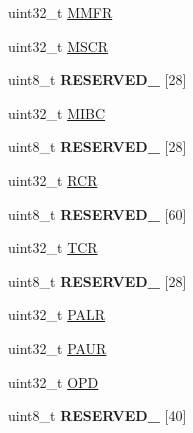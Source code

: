 \begin{DoxyCompactItemize}
\item 
uint32\+\_\+t \hyperlink{struct_e_n_e_t___mem_map_a588920cf00b8cf33e91b9a1fe5ce04ef}{M\+M\+F\+R}
\item 
uint32\+\_\+t \hyperlink{struct_e_n_e_t___mem_map_a635a1d1269e342c592757d49b5073507}{M\+S\+C\+R}
\item 
\hypertarget{struct_e_n_e_t___mem_map_a134f377e8e31e8bafd0b6f84627bc0e5}{}uint8\+\_\+t {\bfseries R\+E\+S\+E\+R\+V\+E\+D\+\_} \mbox{[}28\mbox{]}\label{struct_e_n_e_t___mem_map_a134f377e8e31e8bafd0b6f84627bc0e5}

\item 
uint32\+\_\+t \hyperlink{struct_e_n_e_t___mem_map_ab857a4b0f285d775c06ab7cf96d96f26}{M\+I\+B\+C}
\item 
\hypertarget{struct_e_n_e_t___mem_map_a144a407e1c7678814a03aef7f15e0f59}{}uint8\+\_\+t {\bfseries R\+E\+S\+E\+R\+V\+E\+D\+\_} \mbox{[}28\mbox{]}\label{struct_e_n_e_t___mem_map_a144a407e1c7678814a03aef7f15e0f59}

\item 
uint32\+\_\+t \hyperlink{struct_e_n_e_t___mem_map_a407f506f97473861cf0d5ef5a4649c02}{R\+C\+R}
\item 
\hypertarget{struct_e_n_e_t___mem_map_a09505e054f35a1c0f42b9b4750b62d9f}{}uint8\+\_\+t {\bfseries R\+E\+S\+E\+R\+V\+E\+D\+\_} \mbox{[}60\mbox{]}\label{struct_e_n_e_t___mem_map_a09505e054f35a1c0f42b9b4750b62d9f}

\item 
uint32\+\_\+t \hyperlink{struct_e_n_e_t___mem_map_ab9bb7ecf57ffae10f969d3771994d87e}{T\+C\+R}
\item 
\hypertarget{struct_e_n_e_t___mem_map_a8cc8a8e46f657955e45a040ede157948}{}uint8\+\_\+t {\bfseries R\+E\+S\+E\+R\+V\+E\+D\+\_} \mbox{[}28\mbox{]}\label{struct_e_n_e_t___mem_map_a8cc8a8e46f657955e45a040ede157948}

\item 
uint32\+\_\+t \hyperlink{struct_e_n_e_t___mem_map_aeb3539c7a6972f6d038cf191a2aa6c5b}{P\+A\+L\+R}
\item 
uint32\+\_\+t \hyperlink{struct_e_n_e_t___mem_map_ab22b035762a3a6af6b1ac7f64803f771}{P\+A\+U\+R}
\item 
uint32\+\_\+t \hyperlink{struct_e_n_e_t___mem_map_a36b7b64453feb7e43806d56ae666f152}{O\+P\+D}
\item 
\hypertarget{struct_e_n_e_t___mem_map_aaaa34c5a3068f02056c06b7e0b1ce891}{}uint8\+\_\+t {\bfseries R\+E\+S\+E\+R\+V\+E\+D\+\_} \mbox{[}40\mbox{]}\label{struct_e_n_e_t___mem_map_aaaa34c5a3068f02056c06b7e0b1ce891}


\end{DoxyCompactItemize}
